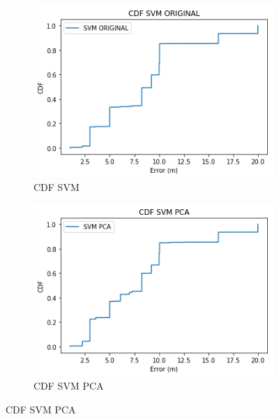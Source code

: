 \begin{figure}[ht!]
\begin{subfigure}{.5\textwidth}
  \centering
  \includegraphics[width=.8\linewidth]{figures/cdf-svm-dinamico.png}
  \caption{CDF SVM}
  \label{fig:sub1}
\end{subfigure}%
\begin{subfigure}{.5\textwidth}
  \centering
  \includegraphics[width=.8\linewidth]{figures/cdf-svmPCA-dinamico.png}
  \caption{CDF SVM PCA}
  \label{fig:sub2}
\end{subfigure}


\end{figure}

